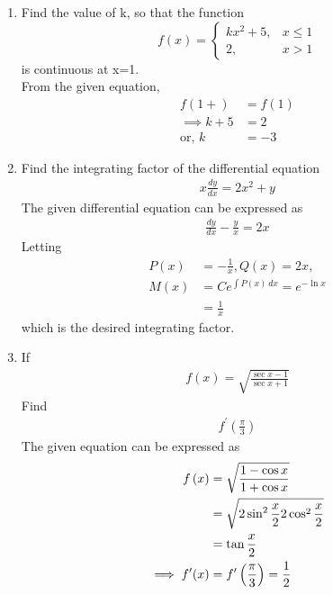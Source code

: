 \documentclass[journal,12pt,twocolumn]{IEEEtran}
\renewcommand\thesection{\arabic{section}}
\begin{document}
\begin{enumerate}[label=\thesection.\arabic*.,ref=\thesection.\theenumi]
\item  Find the value of k, so that the function 
	\begin{equation*}  f(x)  = \begin{cases}
                 k x^2 + 5,  & x \leq 1 \\
        2 , & x  >  1
\end{cases} \end{equation*} 
is continuous at x=1. \\
\solution  From the given equation, 
	\begin{align}  f(1+)  &= f(1)  
		\\
		\implies k+5 &= 2
		\\
		\text{or, } k &= -3
 \end{align} 
\item  Find the integrating factor of the differential equation 
	\begin{align} 
	 x\frac{dy}{dx} = 2x^2 +y 
	\end{align} 
	\solution  The given differential equation can be expressed as
	\begin{align} 
		\frac{dy}{dx} -\frac{y}{x} = 2x 
	\end{align} 
	Letting 
	\begin{align} 
		P(x) &= -\frac{1}{x}, Q(x) = 2x,
		\\
		M(x) &= Ce^{\int P(x)\,dx} = e^{-\ln x}
		\\
		&= \frac{1}{x}
	\end{align} 
	which is the desired integrating factor.

\item If 
	\begin{align} 
		f\left(x\right)= \sqrt{\frac{\sec x-1}{\sec x+1}}\nonumber 
		\end{align} 
		Find 
		\begin{align} 
			f^{\prime}\left(\frac{\pi}{3}\right) \nonumber 
		\end{align}
		\solution The given equation can be expressed as
	\begin{align} 
		f\left(x\right)&= \sqrt{\frac{1-\cos x}{1+\cos x}}
		\\
		&=\sqrt{2 \sin^2{\frac{x}{2}}{2\cos^2 \frac{x}{2}}}
		\\
		&= \tan \frac{x}{2}
		\\
		\implies 
			f^{\prime}(x) &= f^{\prime}\left(\frac{\pi}{3}\right)= \frac{1}{2}
		\end{align} 


\end{enumerate}
\end{document}
